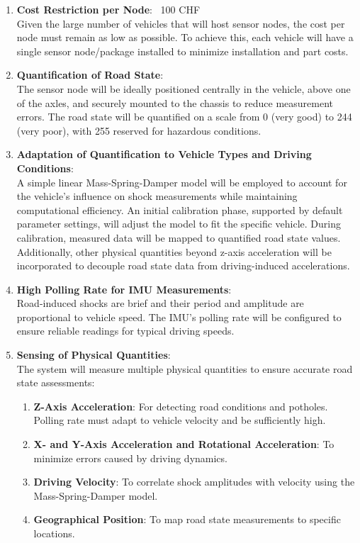 \begin{enumerate}
    \item \textbf{Cost Restriction per Node}: ~100 CHF \\
        Given the large number of vehicles that will host sensor nodes, the cost per node must remain as low as possible. To achieve this, each vehicle will have a single sensor node/package installed to minimize installation and part costs.

    \item \textbf{Quantification of Road State}: \\
        The sensor node will be ideally positioned centrally in the vehicle, above one of the axles, and securely mounted to the chassis to reduce measurement errors. The road state will be quantified on a scale from 0 (very good) to 244 (very poor), with 255 reserved for hazardous conditions.

    \item \textbf{Adaptation of Quantification to Vehicle Types and Driving Conditions}: \\
        A simple linear Mass-Spring-Damper model will be employed to account for the vehicle's influence on shock measurements while maintaining computational efficiency. An initial calibration phase, supported by default parameter settings, will adjust the model to fit the specific vehicle. During calibration, measured data will be mapped to quantified road state values. Additionally, other physical quantities beyond z-axis acceleration will be incorporated to decouple road state data from driving-induced accelerations.

    \item \textbf{High Polling Rate for IMU Measurements}: \\
        Road-induced shocks are brief and their period and amplitude are proportional to vehicle speed. The IMU's polling rate will be configured to ensure reliable readings for typical driving speeds.

    \item \textbf{Sensing of Physical Quantities}: \\
        The system will measure multiple physical quantities to ensure accurate road state assessments:
        \begin{enumerate}
            \item \textbf{Z-Axis Acceleration}: For detecting road conditions and potholes. Polling rate must adapt to vehicle velocity and be sufficiently high.
            \item \textbf{X- and Y-Axis Acceleration and Rotational Acceleration}: To minimize errors caused by driving dynamics.
            \item \textbf{Driving Velocity}: To correlate shock amplitudes with velocity using the Mass-Spring-Damper model.
            \item \textbf{Geographical Position}: To map road state measurements to specific locations.
        \end{enumerate}


\end{enumerate}
